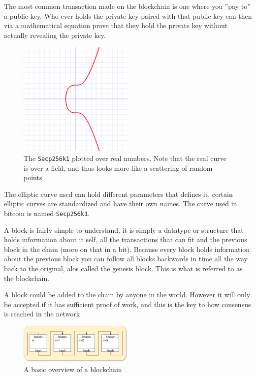 The most common transaction made on the blockchain is one where you ''pay to'' a public key. Who ever holds the private key paired with that public key can then via a mathematical equation prove that they hold the private key without actually revealing the private key.

\begin{figure}[H]
	\centering
	\includegraphics[width=0.5\textwidth]{introduction/images/Secp256k1.png}
	\caption{The \texttt{Secp256k1} plotted over real numbers. Note that the real curve is over a field, and thus looks more like a scattering of random points}
	\label{fig:blockchain}
\end{figure}

The elliptic curve used can hold different parameters that defines it, certain elliptic curves are standardized and have their own names. The curve used in bitcoin is named \texttt{Secp256k1}.

A block is fairly simple to understand, it is simply a datatype or structure that holds information about it self, all the transactions that can fit and the previous block in the chain (more on that in a bit). Because every block holds information about the previous block you can follow all blocks backwards in time all the way back to the original, alos called the genesis block. This is what is referred to as the blockchain. 

A block could be added to the chain by anyone in the world. However it will only be accepted if it has sufficient proof of work, and this is the key to how consensus is reached in the network 

\begin{figure}[H]
	\centering
	\includegraphics[width=0.5\textwidth]{introduction/images/blockchain.png}
	\caption{A basic overview of a blockchain}
	\label{fig:blockchain}
\end{figure}

